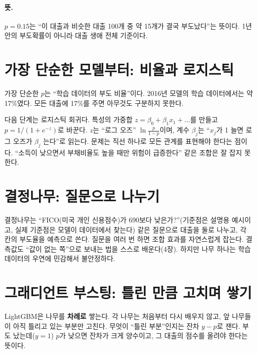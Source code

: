 \paragraph{뜻.} $p = 0.15$는 ``이 대출과 비슷한 대출 100개 중 약 15개가 결국 부도났다''는 뜻이다. 1년 안의 부도확률이 아니라 대출 생애 전체 기준이다.

\section{가장 단순한 모델부터: 비율과 로지스틱}
가장 단순한 $p$는 ``학습 데이터의 부도 비율''이다. 2016년 모델의 학습 데이터에서는 약 17\%였다. 모든 대출에 17\%를 주면 아무것도 구분하지 못한다.

다음 단계는 로지스틱 회귀다. 특성의 가중합 $z=\beta_0+\beta_1x_1+\dots$를 만들고 $p=1/(1+e^{-z})$로 바꾼다. $z$는 ``로그 오즈'' $\ln\frac{p}{1-p}$이며, 계수 $\beta_j$는 ``$x_j$가 1 늘면 로그 오즈가 $\beta_j$ 는다''로 읽는다. 문제는 직선 하나로 모든 관계를 표현해야 한다는 점이다. ``소득이 낮으면서 부채비율도 높을 때만 위험이 급증한다'' 같은 조합은 잘 잡지 못한다.

\section{결정나무: 질문으로 나누기}
결정나무는 ``FICO(미국 개인 신용점수)가 690보다 낮은가?''(기준점은 설명용 예시이고, 실제 기준점은 모델이 데이터에서 찾는다) 같은 질문으로 대출을 둘로 나누고, 각 칸의 부도율을 예측으로 쓴다. 질문을 여러 번 하면 조합 효과를 자연스럽게 잡는다. 결측값도 ``값이 없는 쪽''으로 보내는 법을 스스로 배운다(4장). 하지만 나무 하나는 학습 데이터의 우연에 민감해서 불안정하다.

\section{그래디언트 부스팅: 틀린 만큼 고치며 쌓기}
LightGBM은 나무를 \textbf{차례로} 쌓는다. 각 나무는 처음부터 다시 배우지 않고, 앞 나무들이 아직 틀리고 있는 부분만 고친다. 무엇이 ``틀린 부분''인지는 잔차 $y-p$로 잰다. 부도 났는데($y=1$) $p$가 낮으면 잔차가 크게 양수이고, 그 대출의 점수를 올려야 한다는 뜻이다.

